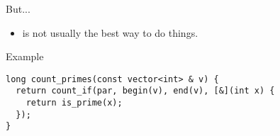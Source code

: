\begin{frame}[t,fragile]{But...}
\begin{itemize}
  \item {} is not usually the best way to do things.
\end{itemize}
\begin{block}{Example}
\begin{lstlisting}[basicstyle=\scriptsize]
long count_primes(const vector<int> & v) {
  return count_if(par, begin(v), end(v), [&](int x) {
    return is_prime(x);
  });
}
\end{lstlisting}
\end{block}
\end{frame}
